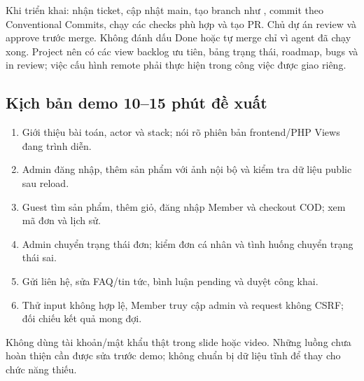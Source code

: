 Khi triển khai: nhận ticket, cập nhật main, tạo branch như , commit theo Conventional Commits, chạy các checks phù hợp và tạo PR. Chủ dự án review và approve trước merge. Không đánh dấu Done hoặc tự merge chỉ vì agent đã chạy xong. Project nên có các view backlog ưu tiên, bảng trạng thái, roadmap, bugs và in review; việc cấu hình remote phải thực hiện trong công việc được giao riêng.

\subsection{Kịch bản demo 10–15 phút đề xuất}
\begin{enumerate}
\item Giới thiệu bài toán, actor và stack; nói rõ phiên bản frontend/PHP Views đang trình diễn.
\item Admin đăng nhập, thêm sản phẩm với ảnh nội bộ và kiểm tra dữ liệu public sau reload.
\item Guest tìm sản phẩm, thêm giỏ, đăng nhập Member và checkout COD; xem mã đơn và lịch sử.
\item Admin chuyển trạng thái đơn; kiểm đơn cá nhân và tình huống chuyển trạng thái sai.
\item Gửi liên hệ, sửa FAQ/tin tức, bình luận pending và duyệt công khai.
\item Thử input không hợp lệ, Member truy cập admin và request không CSRF; đối chiếu kết quả mong đợi.
\end{enumerate}
Không dùng tài khoản/mật khẩu thật trong slide hoặc video. Những luồng chưa hoàn thiện cần được sửa trước demo; không chuẩn bị dữ liệu tĩnh để thay cho chức năng thiếu.
\clearpage
